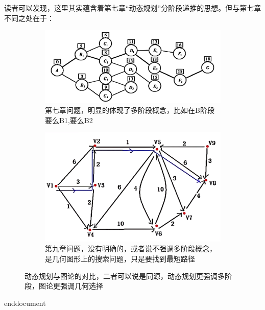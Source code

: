 读者可以发现，这里其实蕴含着第七章“动态规划”分阶段递推的思想。但与第七章不同之处在于：
\begin{figure}[H]
    \centering
    \begin{subfigure}{0.42\textwidth}
        \centering
        \includegraphics[width=\linewidth]{image/32.png}
        \caption{第七章问题，明显的体现了多阶段概念，比如在B阶段要么B1,要么B2}
    \end{subfigure}
    \hfill
    \begin{subfigure}{0.4\textwidth}
        \centering
        \includegraphics[width=\linewidth]{image/40.png}
        \caption{第九章问题，没有明确的，或者说不强调多阶段概念，是几何图形上的搜索问题，只是要找到最短路径}
    \end{subfigure}
    \caption{动态规划与图论的对比，二者可以说是同源，动态规划更强调多阶段，图论更强调几何选择}
\end{figure}
\ifx\allfiles\undefined
	
	
	end{document}
	\else
	\fi